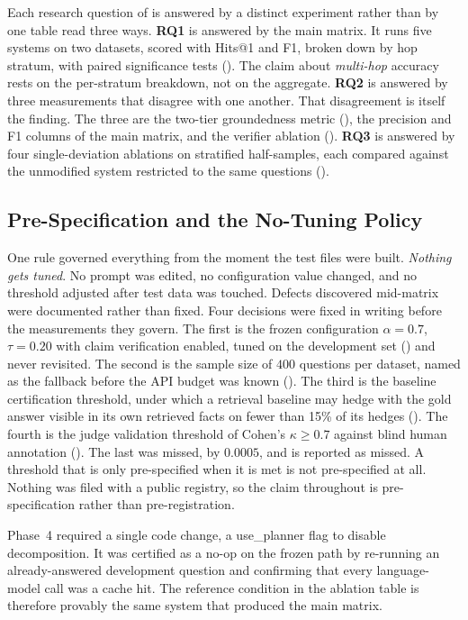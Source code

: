 Each research question of  is answered by a distinct experiment
rather than by one table read three ways. \textbf{RQ1} is answered by the main
matrix. It runs five systems on two datasets, scored with Hits@1 and F1, broken
down by hop stratum, with paired significance tests
(). The claim about
\emph{multi-hop} accuracy rests on the per-stratum breakdown, not on the
aggregate. \textbf{RQ2} is answered by three measurements that disagree with one
another. That disagreement is itself the finding. The three are the two-tier
groundedness metric (), the precision and F1
columns of the main matrix, and the verifier ablation ().
\textbf{RQ3} is answered by four single-deviation ablations on stratified
half-samples, each compared against the unmodified system restricted to the same
questions ().

\subsection{Pre-Specification and the No-Tuning
Policy}\label{sec:pre-registration}

One rule governed everything from the moment the test files were built.
\emph{Nothing gets tuned}. No prompt was edited, no configuration value changed,
and no threshold adjusted after test data was touched. Defects discovered
mid-matrix were documented rather than fixed. Four decisions were fixed in
writing before the measurements they govern. The first is the frozen
configuration $\alpha = 0.7$, $\tau = 0.20$ with claim verification enabled,
tuned on the development set () and never revisited. The
second is the sample size of $400$ questions per dataset, named as the fallback
before the API budget was known (). The third is the
baseline certification threshold, under which a retrieval baseline may hedge
with the gold answer visible in its own retrieved facts on fewer than 15\% of
its hedges (). The fourth is the judge validation threshold
of Cohen's $\kappa \geq 0.7$ against blind human annotation ().
The last was missed, by $0.0005$, and is reported as missed. A threshold that is
only pre-specified when it is met is not pre-specified at all. Nothing was filed
with a public registry, so the claim throughout is pre-specification rather than
pre-registration.

Phase~4 required a single code change, a \textsf{use\_planner} flag to disable
decomposition. It was certified as a no-op on the frozen path by re-running an
already-answered development question and confirming that every language-model
call was a cache hit. The reference condition in the ablation table is therefore
provably the same system that produced the main matrix.

